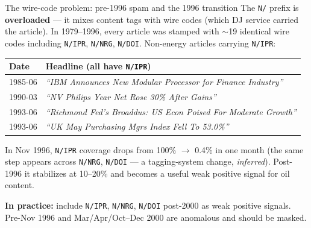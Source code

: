 \documentclass[10pt,aspectratio=169]{beamer}
\begin{document}
\begin{frame}{The wire-code problem: pre-1996 spam and the 1996 transition}
  \scriptsize
  The \texttt{N/} prefix is \textbf{overloaded} --- it mixes content tags
  with wire codes (which DJ service carried the article). In 1979--1996,
  every article was stamped with $\sim$19 identical wire codes including
  \texttt{N/IPR}, \texttt{N/NRG}, \texttt{N/DOI}. Non-energy articles carrying
  \texttt{N/IPR}:

  \smallskip
  \begin{tabular}{@{}lp{9cm}@{}}
    \toprule
    \textbf{Date} & \textbf{Headline (all have \texttt{N/IPR})} \\
    \midrule
    1985-06 & \textit{``IBM Announces New Modular Processor for Finance Industry''} \\
    1990-03 & \textit{``NV Philips Year Net Rose 30\% After Gains''} \\
    1993-06 & \textit{``Richmond Fed's Broaddus: US Econ Poised For Moderate Growth''} \\
    1993-06 & \textit{``UK May Purchasing Mgrs Index Fell To 53.0\%''} \\
    \bottomrule
  \end{tabular}

  \smallskip
  In Nov 1996, \texttt{N/IPR} coverage drops from 100\% $\to$ 0.4\% in one
  month (the same step appears across \texttt{N/NRG}, \texttt{N/DOI} --- a
  tagging-system change, \textit{inferred}). Post-1996 it stabilizes at
  10--20\% and becomes a useful weak positive signal for oil content.

  \smallskip
  \textbf{In practice:} include \texttt{N/IPR}, \texttt{N/NRG}, \texttt{N/DOI}
  post-2000 as weak positive signals. Pre-Nov 1996 and Mar/Apr/Oct--Dec 2000
  are anomalous and should be masked.

\end{frame}
\end{document}
